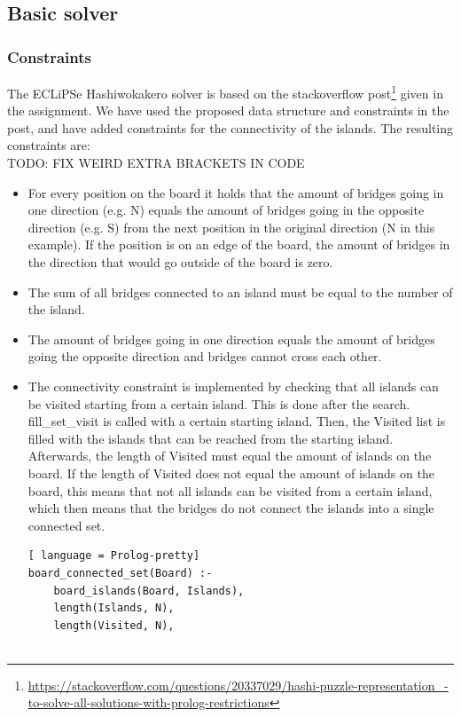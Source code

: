 \documentclass{report}
\begin{document}
\subsection{Basic solver}
\subsubsection{Constraints}
The ECLiPSe Hashiwokakero solver is based on the stackoverflow post\footnote{\url{https://stackoverflow.com/questions/20337029/hashi-puzzle-representation\_-to-solve-all-solutions-with-prolog-restrictions}} given in the assignment. We have used the proposed data structure and constraints in the post, and have added constraints for the connectivity of the islands. The resulting constraints are:
\\
TODO: FIX WEIRD EXTRA BRACKETS IN CODE
\begin{itemize}
	\item For every position on the board it holds that the amount of bridges going in one direction (e.g. N) equals the amount of bridges going in the opposite direction (e.g. S) from the next position in the original direction (N in this example). If the position is on an edge of the board, the amount of bridges in the direction that would go outside of the board is zero.

        

    \item The sum of all bridges connected to an island must be equal to the number of the island.
        

    \item The amount of bridges going in one direction equals the amount of bridges going the opposite direction and bridges cannot cross each other.
        

    \item The connectivity constraint is implemented by checking that all islands can be visited starting from a certain island. This is done after the search. fill\_set\_visit is called with a certain starting island. Then, the Visited list is filled with the islands that can be reached from the starting island. Afterwards, the length of Visited must equal the amount of islands on the board. If the length of Visited does not equal the amount of islands on the board, this means that not all islands can be visited from a certain island, which then means that the bridges do not connect the islands into a single connected set.
\begin{lstlisting}[ language = Prolog-pretty]
board_connected_set(Board) :-
    board_islands(Board, Islands),
    length(Islands, N),
    length(Visited, N),


\end{lstlisting}
\end{itemize}
\end{document}
